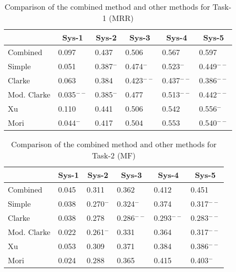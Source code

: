 \begin{table}[t]
  \begin{center}
    \caption{Comparison of the combined method and other methods for Task-1 (MRR)}
    \begin{tabular}{|l|l|l|l|l|l|} \hline
         &  \multicolumn{1}{c|}{Sys-1}        & \multicolumn{1}{c|}{Sys-2}        & \multicolumn{1}{c|}{Sys-3}        & \multicolumn{1}{c|}{Sys-4}        & \multicolumn{1}{c|}{Sys-5}        \\\hline
Combined &  0.097        & 0.437        & 0.506        & 0.567        & 0.597      \\\hline
Simple   &  0.051        & 0.387$^{-}$  & 0.474$^{-}$  & 0.523$^{-}$  & 0.449$^{--}$\\
Clarke   &  0.063        & 0.384        & 0.423$^{--}$ & 0.437$^{--}$ & 0.386$^{--}$\\
Mod. Clarke&0.035$^{--}$ & 0.385$^{-}$  & 0.477        & 0.513$^{--}$ & 0.442$^{--}$\\
Xu       &  0.110        & 0.441        & 0.506        & 0.542        & 0.556$^{-}$\\
Mori     &  0.044$^{-}$  & 0.417        & 0.504        & 0.553        & 0.540$^{--}$\\\hline
\end{tabular}
\label{tab:task-1-comp}
\end{center}
\end{table}

\begin{table}[t]
  \begin{center}
    \caption{Comparison of the combined method and other methods for Task-2 (MF)}
    \begin{tabular}{|l|l|l|l|l|l|} \hline
         &  \multicolumn{1}{c|}{Sys-1}        & \multicolumn{1}{c|}{Sys-2}        & \multicolumn{1}{c|}{Sys-3}        & \multicolumn{1}{c|}{Sys-4}        & \multicolumn{1}{c|}{Sys-5}        \\\hline
Combined &  0.045        & 0.311        & 0.362        & 0.412        & 0.451        \\\hline
Simple   &  0.038        & 0.270$^{-}$  & 0.324$^{-}$  & 0.374        & 0.317$^{--}$ \\
Clarke   &  0.038        & 0.278        & 0.286$^{--}$ & 0.293$^{--}$ & 0.283$^{--}$\\
Mod. Clarke&0.022        & 0.261$^{-}$  & 0.331        & 0.364        & 0.317$^{--}$\\
Xu       &  0.053        & 0.309        & 0.371        & 0.384        & 0.386$^{--}$\\
Mori     &  0.024        & 0.288        & 0.365        & 0.415        & 0.403$^{-}$\\\hline      
\end{tabular}
\label{tab:task-2-comp}
\end{center}
\end{table}

